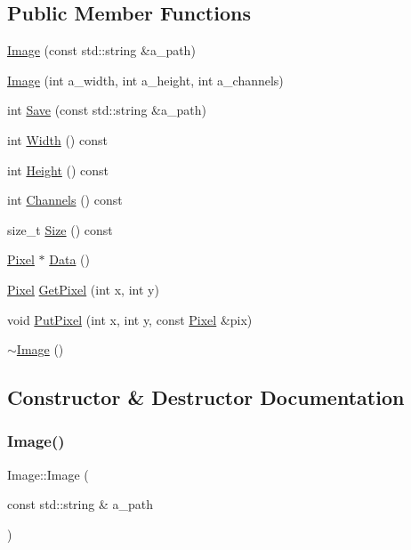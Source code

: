 \subsection*{Public Member Functions}
\begin{DoxyCompactItemize}
\item 
\hyperlink{structImage_a9a7eb017b8c9babc495030a6d5e34e5a}{Image} (const std\+::string \&a\+\_\+path)
\item 
\hyperlink{structImage_ad04e368629b03afab0737f1b523947f9}{Image} (int a\+\_\+width, int a\+\_\+height, int a\+\_\+channels)
\item 
int \hyperlink{structImage_a4cb69c5911f1f8e4944047825dcf117c}{Save} (const std\+::string \&a\+\_\+path)
\item 
int \hyperlink{structImage_a191889676e394b6eba27e994edb7e02d}{Width} () const
\item 
int \hyperlink{structImage_a617543a57fd7abf1a4a052539fe35807}{Height} () const
\item 
int \hyperlink{structImage_acd164a8d76fb05eb3f0123b50032b4a4}{Channels} () const
\item 
size\+\_\+t \hyperlink{structImage_a3690a0986d16c2f5f30e2625e645cc8e}{Size} () const
\item 
\hyperlink{structPixel}{Pixel} $\ast$ \hyperlink{structImage_aad45e088de1f92fde63d3bcd7d542cdd}{Data} ()
\item 
\hyperlink{structPixel}{Pixel} \hyperlink{structImage_a0bedb6561074b2cdf3f5a577c80e043a}{Get\+Pixel} (int x, int y)
\item 
void \hyperlink{structImage_ad728f53861c64498690a311abe1667c4}{Put\+Pixel} (int x, int y, const \hyperlink{structPixel}{Pixel} \&pix)
\item 
\hyperlink{structImage_a0294f63700543e11c0f0da85601c7ae5}{$\sim$\+Image} ()
\end{DoxyCompactItemize}


\subsection{Constructor \& Destructor Documentation}
\mbox{\label{structImage_a9a7eb017b8c9babc495030a6d5e34e5a}} 
\subsubsection{\texorpdfstring{Image()}{Image()}\hspace{0.1cm}{\footnotesize\ttfamily [1/2]}}
{\footnotesize\ttfamily Image\+::\+Image (\begin{DoxyParamCaption}\item[{const std\+::string \&}]{a\+\_\+path }\end{DoxyParamCaption})\hspace{0.3cm}{\ttfamily [explicit]}}

